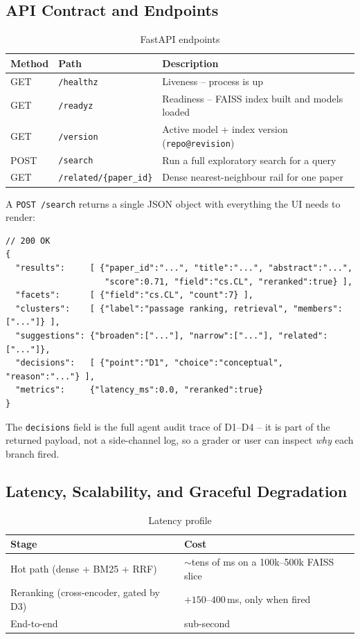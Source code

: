 \documentclass[12pt,a4paper]{article}
\begin{document}
\subsection{API Contract and Endpoints}

\begin{table}[H]
\centering
\caption{FastAPI endpoints}
\small
\begin{tabularx}{\linewidth}{@{} l l L @{}}
\toprule
\textbf{Method} & \textbf{Path} & \textbf{Description} \\
\midrule
GET & \texttt{/healthz} & Liveness -- process is up \\
GET & \texttt{/readyz} & Readiness -- FAISS index built and models loaded \\
GET & \texttt{/version} & Active model + index version (\texttt{repo@revision}) \\
POST & \texttt{/search} & Run a full exploratory search for a query \\
GET & \texttt{/related/\{paper\_id\}} & Dense nearest-neighbour rail for one paper \\
\bottomrule
\end{tabularx}
\end{table}

A \texttt{POST /search} returns a single JSON object with everything the UI needs to render:

\begin{lstlisting}[basicstyle=\ttfamily\footnotesize]
// 200 OK
{
  "results":     [ {"paper_id":"...", "title":"...", "abstract":"...",
                    "score":0.71, "field":"cs.CL", "reranked":true} ],
  "facets":      [ {"field":"cs.CL", "count":7} ],
  "clusters":    [ {"label":"passage ranking, retrieval", "members":["..."]} ],
  "suggestions": {"broaden":["..."], "narrow":["..."], "related":["..."]},
  "decisions":   [ {"point":"D1", "choice":"conceptual", "reason":"..."} ],
  "metrics":     {"latency_ms":0.0, "reranked":true}
}
\end{lstlisting}

The \texttt{decisions} field is the full agent audit trace of D1--D4 -- it is part of the returned payload, not a side-channel log, so a grader or user can inspect \emph{why} each branch fired.

\subsection{Latency, Scalability, and Graceful Degradation}

\begin{table}[H]
\centering
\caption{Latency profile}
\begin{tabular}{ll}
\toprule
\textbf{Stage} & \textbf{Cost} \\
\midrule
Hot path (dense + BM25 + RRF) & $\sim$tens of ms on a 100k--500k FAISS slice \\
Reranking (cross-encoder, gated by D3) & $+150$--$400$\,ms, only when fired \\
End-to-end & sub-second \\
\bottomrule
\end{tabular}
\end{table}
\end{document}
